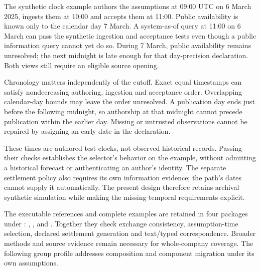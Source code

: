The synthetic clock example authors the assumptions at 09:00 UTC on 6 March
2025, ingests them at 10:00 and accepts them at 11:00. Public availability is
known only to the calendar day 7 March. A system-as-of query at 11:00 on 6 March
can pass the synthetic ingestion and acceptance tests even though a public
information query cannot yet do so. During 7 March, public availability remains
unresolved; the next midnight is late enough for that day-precision declaration.
Both views still require an eligible source opening.

Chronology matters independently of the cutoff. Exact equal timestamps can
satisfy nondecreasing authoring, ingestion and acceptance order. Overlapping
calendar-day bounds may leave the order unresolved. A publication day ends
just before the following midnight, so authorship at that midnight cannot
precede publication within the earlier day. Missing or untrusted observations
cannot be repaired by assigning an early date in the declaration.

These times are authored test clocks, not observed historical records. Passing
their checks establishes the selector's behavior on the example, without
admitting a historical forecast or authenticating an author's identity. The
separate settlement policy also requires its own information evidence; the
path's dates cannot supply it automatically. The present design therefore
retains archival synthetic simulation while making the missing temporal
requirements explicit.

The executable references and complete examples are retained in four packages
under :
,
,
 and
.
Together they check exchange consistency, assumption-time selection, declared
settlement generation and text/typed correspondence. Broader methods and source
evidence remain necessary for whole-company coverage. The following group
profile addresses composition and component migration under its own assumptions.
